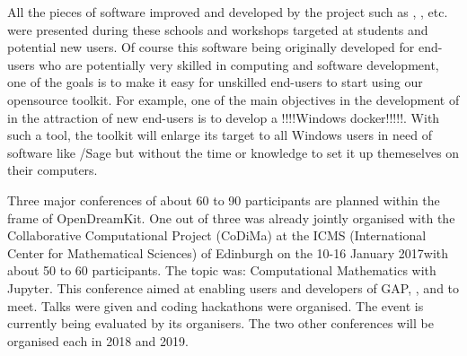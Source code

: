 \documentclass{deliverablereport}
\begin{document}
All the pieces of software improved and developed by the project such as \Sage, \Singular, etc. were presented during these schools and workshops targeted at students and potential new users. Of course this software being originally developed for end-users who are potentially very skilled in computing and software development, one of the goals is to make it easy  for unskilled end-users to start using our opensource toolkit. 
For example, one of the main objectives in the development of \Sage in the attraction of new end-users is to develop a !!!!Windows docker!!!!!. With such a tool, the toolkit will enlarge its target to all Windows users in need of software like /Sage but without the time or knowledge to set it up themeselves on their computers.

Three major conferences of about 60 to 90 participants are planned within the frame of OpenDreamKit. One out of three was already jointly organised with the Collaborative Computational Project (CoDiMa) at the ICMS (International Center for Mathematical Sciences) of Edinburgh on the 10-16 January 2017with about 50 to 60 participants. The topic was: Computational Mathematics with Jupyter. This conference aimed at enabling users and developers of GAP, \Singular, \Sage and \Jupyter to meet. Talks were given and coding hackathons were organised. The event is currently being evaluated by its organisers. 
The two other conferences will be organised each in 2018 and 2019.

\end{document}
